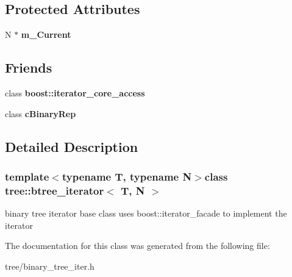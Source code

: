 \subsection*{\-Protected \-Attributes}
\begin{DoxyCompactItemize}
\item 
\hypertarget{classtree_1_1btree__iterator_a3fe0a773310404a612dc9a46abfd5471}{\-N $\ast$ {\bfseries m\-\_\-\-Current}}\label{classtree_1_1btree__iterator_a3fe0a773310404a612dc9a46abfd5471}

\end{DoxyCompactItemize}
\subsection*{\-Friends}
\begin{DoxyCompactItemize}
\item 
\hypertarget{classtree_1_1btree__iterator_ac09f73e325921cc50ebcd96bed0f8096}{class {\bfseries boost\-::iterator\-\_\-core\-\_\-access}}\label{classtree_1_1btree__iterator_ac09f73e325921cc50ebcd96bed0f8096}

\item 
\hypertarget{classtree_1_1btree__iterator_a3bb2150f15bc37d06135e1e488e81e77}{class {\bfseries c\-Binary\-Rep}}\label{classtree_1_1btree__iterator_a3bb2150f15bc37d06135e1e488e81e77}

\end{DoxyCompactItemize}


\subsection{\-Detailed \-Description}
\subsubsection*{template$<$typename \-T, typename \-N$>$class tree\-::btree\-\_\-iterator$<$ T, N $>$}

binary tree iterator base class uses boost\-::iterator\-\_\-facade to implement the iterator 

\-The documentation for this class was generated from the following file\-:\begin{DoxyCompactItemize}
\item 
tree/binary\-\_\-tree\-\_\-iter.\-h\end{DoxyCompactItemize}
